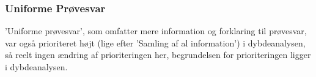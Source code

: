 \subsubsection{Uniforme Prøvesvar}
’Uniforme prøvesvar’, som omfatter mere information og forklaring til prøvesvar, var også prioriteret højt (lige efter ’Samling af al information’) i dybdeanalysen, så reelt ingen ændring af prioriteringen her, begrundelsen for prioriteringen ligger i dybdeanalysen.  
